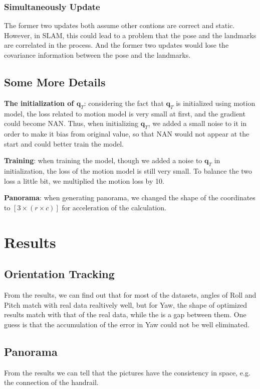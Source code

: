 \documentclass[conference]{IEEEtran}
\begin{document}
\subsubsection{Simultaneously Update}
The former two updates both assume other contions are correct and static. However, in SLAM, this could lead to a problem that 
the pose and the landmarks are correlated in the process. And the former two updates would lose the covariance information
between the pose and the landmarks.

\subsection{Some More Details}
\textbf{The initialization of $\boldsymbol{q}_T$}: considering the fact that $\boldsymbol{q}_T$ is initialized using
motion model, the loss related to motion model is very small at first, and the gradient could become NAN. Thus, when
initializing $\boldsymbol{q}_T$, we added a small noise to it in order to make it bias from original value, so that
NAN would not appear at the start and could better train the model.

\textbf{Training}: when training the model, though we added a noise to $\boldsymbol{q}_T$ in initialization, the loss of
the motion model is still very small. To balance the two loss a little bit, we multiplied the motion loss by 10.

\textbf{Panorama}: when generating panorama, we changed the shape of the coordinates to $[3 \times (r \times c)]$ for
acceleration of the calculation.


\section{Results}
\subsection{Orientation Tracking}
From the results, we can find out that for most of the datasets, angles of Roll and Pitch match with real data realtively
well, but for Yaw, the shape of optimized results match with that of the real data, while the is a gap between them. One
guess is that the accumulation of the error in Yaw could not be well eliminated.

\subsection{Panorama}
From the results we can tell that the pictures have the consistency in space, e.g. the connection of the handrail.
\end{document}
